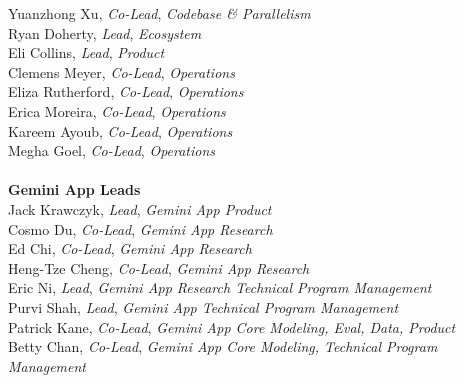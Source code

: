 \begin{minipage}[t]{0.55\linewidth}
Yuanzhong Xu, \textit{Co-Lead}, \textit{Codebase \& Parallelism} \\
Ryan Doherty, \textit{Lead}, \textit{Ecosystem} \\
Eli Collins, \textit{Lead}, \textit{Product} \\
Clemens Meyer, \textit{Co-Lead}, \textit{Operations} \\
Eliza Rutherford, \textit{Co-Lead}, \textit{Operations} \\
Erica Moreira, \textit{Co-Lead}, \textit{Operations} \\
Kareem Ayoub, \textit{Co-Lead}, \textit{Operations} \\
Megha Goel, \textit{Co-Lead}, \textit{Operations} \\
\\
\textbf{Gemini App Leads} \\
Jack Krawczyk, \textit{Lead}, \textit{Gemini App Product} \\
Cosmo Du, \textit{Co-Lead}, \textit{Gemini App Research} \\
Ed Chi, \textit{Co-Lead}, \textit{Gemini App Research} \\
Heng-Tze Cheng, \textit{Co-Lead}, \textit{Gemini App Research} \\
Eric Ni, \textit{Lead}, \textit{Gemini App Research Technical Program Management} \\
Purvi Shah, \textit{Lead}, \textit{Gemini App Technical Program Management} \\
Patrick Kane, \textit{Co-Lead}, \textit{Gemini App Core Modeling, Eval, Data, Product} \\
Betty Chan, \textit{Co-Lead}, \textit{Gemini App Core Modeling, Technical Program Management} \\
\end{minipage}
\hspace{10pt}
